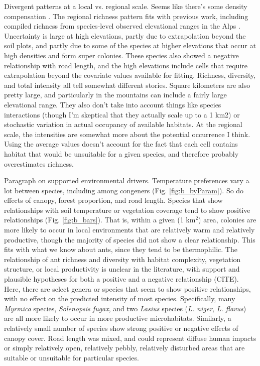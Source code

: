 \documentclass[preprint,final,times,12pt,3p]{elsarticle}
\begin{document}
Divergent patterns at a local vs. regional scale. Seems like there's some density compensation \citep{LongColw2011}. The regional richness pattern fits with previous work, including compiled richness from species-level observed elevational ranges in the Alps \citep{Hellrigl2003,Glaser2006,SzewczykMcCain2016,Szewczyk2018}. Uncertainty is large at high elevations, partly due to extrapolation beyond the soil plots, and partly due to some of the species at higher elevations that occur at high densities and form super colonies. These species also showed a negative relationship with road length, and the high elevations include cells that require extrapolation beyond the covariate values available for fitting. Richness, diversity, and total intensity all tell somewhat different stories. Square kilometers are also pretty large, and particularly in the mountains can include a fairly large elevational range. They also don't take into account things like species interactions (though I'm skeptical that they actually scale up to a 1 km2) or stochastic variation in actual occupancy of available habitats. At the regional scale, the intensities are somewhat more about the potential occurrence I think. Using the average values doesn't account for the fact that each cell contains habitat that would be unsuitable for a given species, and therefore probably overestimates richness.

Paragraph on supported environmental drivers. Temperature preferences vary a lot between species, including among congeners (Fig. \ref{fig:b_byParam}). So do effects of canopy, forest proportion, and road length. Species that show relationships with soil temperature or vegetation coverage tend to show positive relationships (Fig. \ref{fig:b_bars}). That is, within a given (1 km$^2$) area, colonies are more likely to occur in local environments that are relatively warm and relatively productive, though the majority of species did not show a clear relationship. This fits with what we know about ants, since they tend to be thermophilic. The relationship of ant richness and diversity with habitat complexity, vegetation structure, or local productivity is unclear in the literature, with support and plausible hypotheses for both a positive and a negative relationship (CITE). Here, there are select genera or species that seem to show positive relationships, with no effect on the predicted intensity of most species. Specifically, many \emph{Myrmica} species, \emph{Solenopsis fugax}, and two \emph{Lasius} species (\emph{L. niger}, \emph{L. flavus}) are all more likely to occur in more productive microhabitats. Similarly, a relatively small number of species show strong positive or negative effects of canopy cover. Road length was mixed, and could represent diffuse human impacts or simply relatively open, relatively pebbly, relatively disturbed areas that are suitable or unsuitable for particular species.
\end{document}
